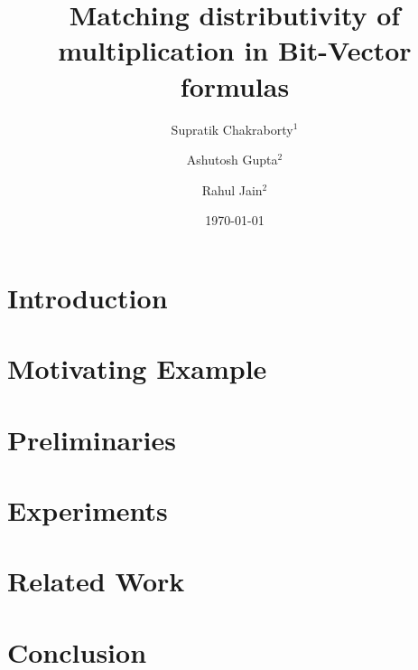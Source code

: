 \documentclass{llncs}
\begin{document}
\title{Matching distributivity of multiplication in Bit-Vector formulas}

\author{Supratik Chakraborty$^1$ \and Ashutosh Gupta$^2$ \and Rahul Jain$^2$}


\date{\today}

\maketitle
\begin{abstract}

\end{abstract}

\section{Introduction}
\label{sec:intro}


\section{Motivating Example}
\label{sec:motivating}


\section{Preliminaries}
\label{sec:prelim}


% 

\section{Experiments}
\label{sec:experiments}


\section{Related Work}
\label{sec:related}

\section{Conclusion}
\label{sec:conclusion}




\end{document}
